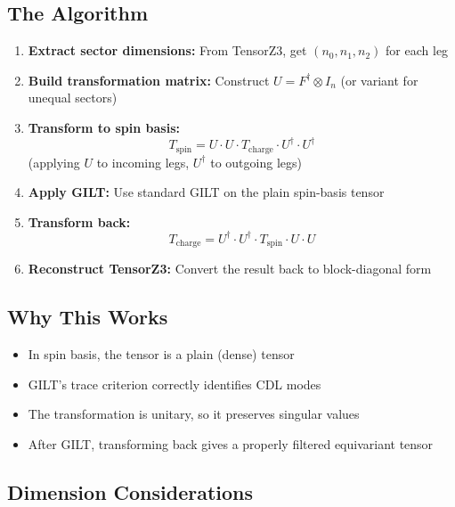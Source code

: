 \documentclass{article}
\begin{document}
\subsection{The Algorithm}

\begin{enumerate}
    \item \textbf{Extract sector dimensions:} From TensorZ3, get $(n_0, n_1, n_2)$ for each leg
    \item \textbf{Build transformation matrix:} Construct $U = F^\dagger \otimes I_n$ (or variant for unequal sectors)
    \item \textbf{Transform to spin basis:}
    \begin{equation}
        T_{\text{spin}} = U \cdot U \cdot T_{\text{charge}} \cdot U^\dagger \cdot U^\dagger
    \end{equation}
    (applying $U$ to incoming legs, $U^\dagger$ to outgoing legs)
    \item \textbf{Apply GILT:} Use standard GILT on the plain spin-basis tensor
    \item \textbf{Transform back:}
    \begin{equation}
        T_{\text{charge}} = U^\dagger \cdot U^\dagger \cdot T_{\text{spin}} \cdot U \cdot U
    \end{equation}
    \item \textbf{Reconstruct TensorZ3:} Convert the result back to block-diagonal form
\end{enumerate}

\subsection{Why This Works}

\begin{itemize}
    \item In spin basis, the tensor is a plain (dense) tensor
    \item GILT's trace criterion correctly identifies CDL modes
    \item The transformation is unitary, so it preserves singular values
    \item After GILT, transforming back gives a properly filtered equivariant tensor
\end{itemize}

\subsection{Dimension Considerations}
\end{document}
